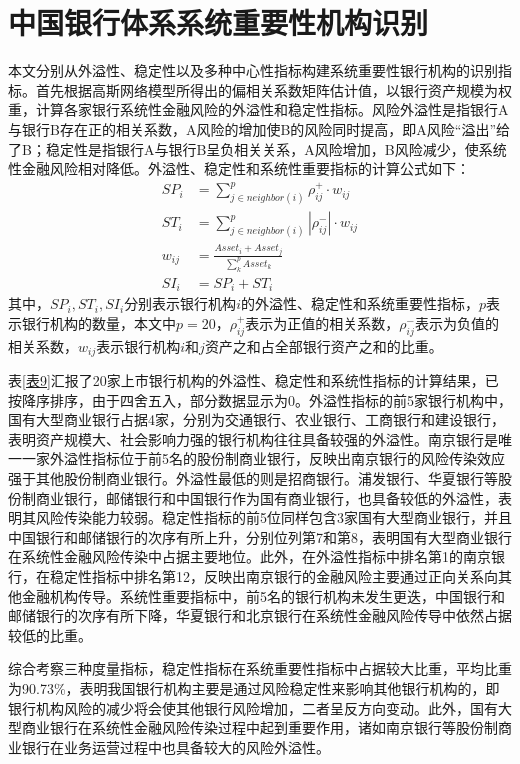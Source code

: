 \documentclass[lang=cn]{elegantpaper}
\begin{document}
\section{中国银行体系系统重要性机构识别}
本文分别从外溢性、稳定性以及多种中心性指标构建系统重要性银行机构的识别指标。首先根据高斯网络模型所得出的偏相关系数矩阵估计值，以银行资产规模为权重，计算各家银行系统性金融风险的外溢性和稳定性指标。风险外溢性是指银行A与银行B存在正的相关系数，A风险的增加使B的风险同时提高，即A风险“溢出”给了B；稳定性是指银行A与银行B呈负相关关系，A风险增加，B风险减少，使系统性金融风险相对降低。外溢性、稳定性和系统性重要指标的计算公式如下：
\begin{align}
    SP_i&=\sum_{j\in neighbor(i)}^p \rho_{ij}^{+}\cdot w_{ij}\\
    ST_i&=\sum_{j\in neighbor(i)}^p |\rho_{ij}^{-}|\cdot w_{ij}\\
    w_{ij}&=\frac{Asset_i+Asset_j}{\sum_k^p Asset_k}\\
    SI_i&=SP_i+ST_i
\end{align}
其中，$SP_i,ST_i,SI_i$分别表示银行机构$i$的外溢性、稳定性和系统重要性指标，$p$表示银行机构的数量，本文中$p=20$，$\rho_{ij}^{+}$表示为正值的相关系数，$\rho_{ij}^{-}$表示为负值的相关系数，$w_{ij}$表示银行机构$i$和$j$资产之和占全部银行资产之和的比重。

表\ref{表9}汇报了20家上市银行机构的外溢性、稳定性和系统性指标的计算结果，已按降序排序，由于四舍五入，部分数据显示为0。外溢性指标的前5家银行机构中，国有大型商业银行占据4家，分别为交通银行、农业银行、工商银行和建设银行，表明资产规模大、社会影响力强的银行机构往往具备较强的外溢性。南京银行是唯一一家外溢性指标位于前5名的股份制商业银行，反映出南京银行的风险传染效应强于其他股份制商业银行。外溢性最低的则是招商银行。浦发银行、华夏银行等股份制商业银行，邮储银行和中国银行作为国有商业银行，也具备较低的外溢性，表明其风险传染能力较弱。稳定性指标的前5位同样包含3家国有大型商业银行，并且中国银行和邮储银行的次序有所上升，分别位列第7和第8，表明国有大型商业银行在系统性金融风险传染中占据主要地位。此外，在外溢性指标中排名第1的南京银行，在稳定性指标中排名第12，反映出南京银行的金融风险主要通过正向关系向其他金融机构传导。系统性重要指标中，前5名的银行机构未发生更迭，中国银行和邮储银行的次序有所下降，华夏银行和北京银行在系统性金融风险传导中依然占据较低的比重。

综合考察三种度量指标，稳定性指标在系统重要性指标中占据较大比重，平均比重为90.73\%，表明我国银行机构主要是通过风险稳定性来影响其他银行机构的，即银行机构风险的减少将会使其他银行风险增加，二者呈反方向变动。此外，国有大型商业银行在系统性金融风险传染过程中起到重要作用，诸如南京银行等股份制商业银行在业务运营过程中也具备较大的风险外溢性。
\end{document}
